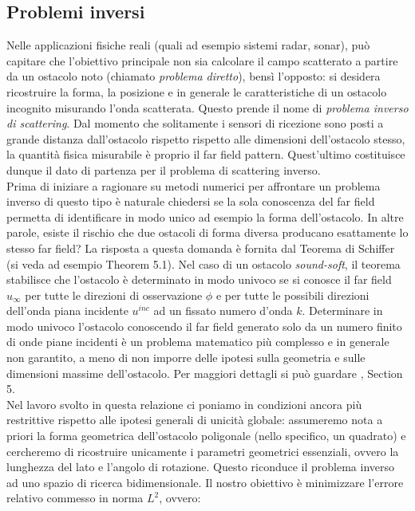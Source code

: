 \documentclass[a4paper,12pt]{article}
\theoremstyle{definition}
\begin{document}
\subsection{Problemi inversi}
Nelle applicazioni fisiche reali (quali ad esempio sistemi radar, sonar), può capitare che l'obiettivo principale non sia calcolare il campo scatterato a partire da un ostacolo noto (chiamato \textit{problema diretto}), bensì l'opposto: si desidera ricostruire la forma, la posizione e in generale le caratteristiche di un ostacolo incognito misurando l'onda scatterata. Questo prende il nome di \textit{problema inverso di scattering}. Dal momento che solitamente i sensori di ricezione sono posti a grande distanza dall'ostacolo rispetto rispetto alle dimensioni dell'ostacolo stesso, la quantità fisica misurabile è proprio il far field pattern. Quest'ultimo costituisce dunque il dato di partenza per il problema di scattering inverso. \\
Prima di iniziare a ragionare su metodi numerici per affrontare un problema inverso di questo tipo è naturale chiedersi se la sola conoscenza del far field permetta di identificare in modo  unico ad esempio la forma dell'ostacolo. In altre parole, esiste il rischio che due ostacoli di forma diversa producano esattamente lo stesso far field? La risposta a questa domanda è fornita dal Teorema di Schiffer (si veda ad esempio \cite{CK19} Theorem 5.1). Nel caso di un ostacolo \textit{sound-soft}, il teorema stabilisce che l'ostacolo è determinato in modo univoco se si conosce il far field $u_\infty$ per tutte le direzioni di osservazione $\phi$ e per tutte le possibili direzioni dell'onda piana incidente $u^{inc}$ ad un fissato numero d'onda $k$. Determinare in modo univoco l'ostacolo conoscendo il far field generato solo da un numero finito di onde piane incidenti è un problema matematico più complesso e in generale non garantito, a meno di non imporre delle ipotesi sulla geometria e sulle dimensioni massime dell'ostacolo. Per maggiori dettagli si può guardare \cite{CK19}, Section 5.\\
Nel lavoro svolto in questa relazione ci poniamo in condizioni ancora più restrittive rispetto alle ipotesi generali di unicità globale: assumeremo nota a priori la forma geometrica dell'ostacolo poligonale (nello specifico, un quadrato) e cercheremo di ricostruire unicamente i parametri geometrici essenziali, ovvero la lunghezza del lato e l'angolo di rotazione. Questo riconduce il problema inverso ad uno spazio di ricerca bidimensionale. Il nostro obiettivo è minimizzare l'errore relativo commesso in norma $L^2$, ovvero:
\end{document}
